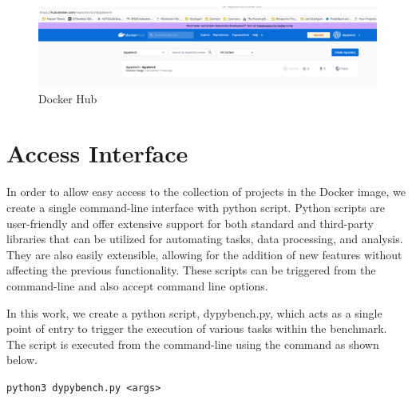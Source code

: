 \begin{figure}[ht]
\centering
\includegraphics[width=1\linewidth]{figures/implementation/docker_hub.png}
\caption[DyPyBench Docker Hub]{\label{fig:dypybench docker}Docker Hub}
\end{figure}

\section{Access Interface}
\label{impl:Access Interface}
In order to allow easy access to the collection of projects in the Docker image, we create a single command-line interface with python script.
Python scripts are user-friendly and offer extensive support for both standard and third-party libraries that can be utilized for automating tasks, data processing, and analysis.
They are also easily extensible, allowing for the addition of new features without affecting the previous functionality.
These scripts can be triggered from the command-line and also accept command line options.

In this work, we create a python script, dypybench.py, which acts as a single point of entry to trigger the execution of various tasks within the benchmark.
The script is executed from the command-line using the command as shown below.

\verb$python3 dypybench.py <args>$

